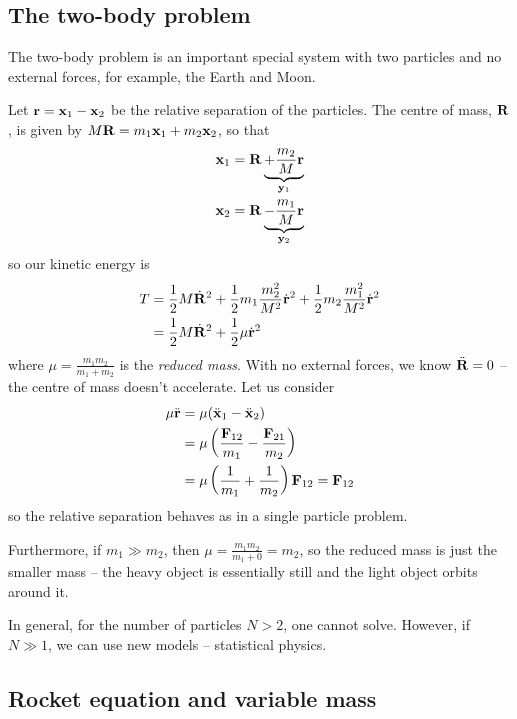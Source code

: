 \documentclass{../../template/note}
\begin{document}

    \subsection{The two-body problem}

    The two-body problem is an important special system with two particles and no external forces, for example, the Earth and Moon.

    Let \(\V r = \V x_1 - \V x_2\) be the relative separation of the particles. The centre of mass, \(\V R\), is given by \(M \V R = m_1 \V x_1 + m_2 \V x_2\), so that
    \begin{align*}
        \V x_1 &= \V R \underbrace{+ \frac{m_2} M \V r}_{\V y_1} \\
        \V x_2 &= \V R \underbrace{- \frac{m_1} M \V r}_{\V y_2}
    \end{align*}
    so our kinetic energy is
    \begin{align*}
        T &= \frac 1 2 M \dot{\V R}^2 + \frac 1 2 m_1 \frac{m_2^2}{M^2} \dot{\V r}^2 + \frac 1 2 m_2 \frac{m_1^2}{M^2} \dot{\V r}^2 \\ 
        &= \frac 1 2 M \dot{\V R}^2 + \frac 1 2 \mu \dot{\V r}^2
    \end{align*}
    where \(\mu = \frac{m_1m_2}{m_1 + m_2}\) is the \emph{reduced mass}. With no external forces, we know \(\ddot{\V R} = 0\) -- the centre of mass doesn't accelerate. Let us consider
    \begin{align*}
        \mu \ddot{\V r} &= \mu(\ddot{\V x}_1 - \ddot{\V x}_2) \\
        &= \mu \left(\frac{\V F_{12}}{m_1} - \frac{\V F_{21}}{m_2}\right) \\
        &= \mu \left(\frac 1 {m_1} + \frac 1 {m_2}\right) \V F_{12} = \V F_{12}
    \end{align*}
    so the relative separation behaves as in a single particle problem.

    Furthermore, if \(m_1 \gg m_2\), then \(\mu = \frac{m_1m_2}{m_1 + 0} = m_2\), so the reduced mass is just the smaller mass -- the heavy object is essentially still and the light object orbits around it.
    
    In general, for the number of particles \(N > 2\), one cannot solve. However, if \(N \gg 1\), we can use new models -- statistical physics.
    
    \subsection{Rocket equation and variable mass}
\end{document}
